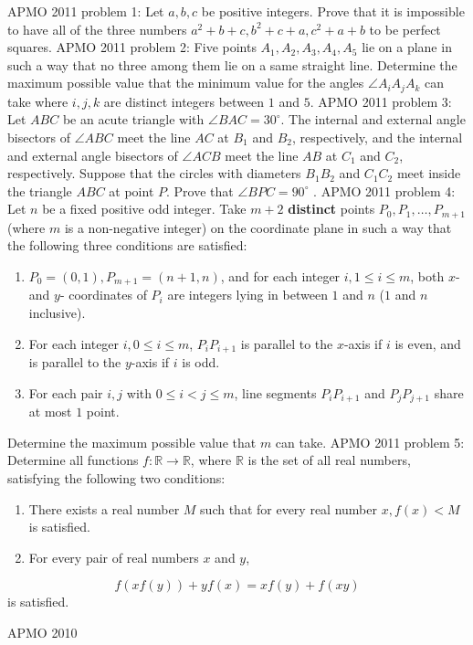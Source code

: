 APMO 2011 problem 1:  Let $a,b,c$ be positive integers. Prove that it is impossible to have all of the three numbers $a^2+b+c,b^2+c+a,c^2+a+b$ to be perfect squares. 
APMO 2011 problem 2:  Five points $A_1,A_2,A_3,A_4,A_5$ lie on a plane in such a way that no three among them lie on a same straight line. Determine the maximum possible value that the minimum value for the angles $\angle A_iA_jA_k$ can take where $i, j, k$ are distinct integers between $1$ and $5$. 
APMO 2011 problem 3:  Let $ABC$ be an acute triangle with $\angle BAC=30^{\circ}$. The internal and external angle bisectors of $\angle ABC$ meet the line $AC$ at $B_1$ and $B_2$, respectively, and the internal and external angle bisectors of $\angle ACB$ meet the line $AB$ at $C_1$ and $C_2$, respectively. Suppose that the circles with diameters $B_1B_2$ and $C_1C_2$ meet inside the triangle $ABC$ at point $P$. Prove that $\angle BPC=90^{\circ}$ . 
APMO 2011 problem 4:  Let $n$ be a fixed positive odd integer. Take $m+2$ \textbf{distinct} points $P_0,P_1,\ldots ,P_{m+1}$ (where $m$ is a non-negative integer) on the coordinate plane in such a way that the following three conditions are satisfied:
\begin{enumerate}[1)]
  \item $P_0=(0,1),P_{m+1}=(n+1,n)$, and for each integer $i,1\le i\le m$, both $x$- and $y$- coordinates of $P_i$ are integers lying in between $1$ and $n$ ($1$ and $n$ inclusive).
  \item For each integer $i,0\le i\le m$, $P_iP_{i+1}$ is parallel to the $x$-axis if $i$ is even, and is parallel to the $y$-axis if $i$ is odd.
  \item For each pair $i,j$ with $0\le i<j\le m$, line segments $P_iP_{i+1}$ and $P_jP_{j+1}$ share at most $1$ point.
\end{enumerate}
Determine the maximum possible value that $m$ can take. 
APMO 2011 problem 5:  Determine all functions $f:\mathbb{R}\to\mathbb{R}$, where $\mathbb{R}$ is the set of all real numbers, satisfying the following two conditions:
\begin{enumerate}[1)]
  \item There exists a real number $M$ such that for every real number $x,f(x)<M$ is satisfied.
  \item For every pair of real numbers $x$ and $y$,
\end{enumerate}
\[ f(xf(y))+yf(x)=xf(y)+f(xy) \]
is satisfied. 

APMO 2010 

